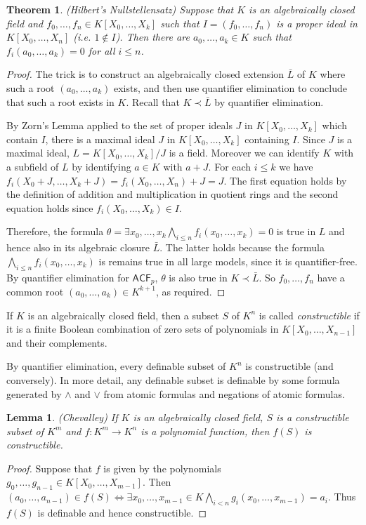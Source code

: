 \documentclass[a4paper, 11pt]{amsart}
\newtheorem{theorem}{Theorem}[subsection]
\newtheorem{lemma}[lemma]{Lemma}
\theoremstyle{remark}
\begin{document}
\begin{theorem} (Hilbert's Nullstellensatz) 
Suppose that $K$ is an algebraically closed field and $f_0,\dots,f_n\in K[X_0,\dots,X_k]$ such that $I=(f_0,\dots,f_n)$ is a proper ideal in $K[X_0,\dots,X_n]$ (i.e. $1\notin I$). Then there are $a_0,\dots,a_k\in K$ such that $f_i(a_0,\dots,a_k)=0$ for all $i\leq n$. 
\end{theorem} 
\begin{proof} 
The trick is to construct an algebraically closed extension $\bar{L}$ of $K$ where such a root $(a_0,\dots,a_k)$ exists, and then use quantifier elimination to conclude that such a root exists in $K$. 
Recall  that $K\prec \bar{L}$ by quantifier elimination. 

By Zorn's Lemma applied to the set of proper ideals $J$ in $K[X_0,\dots,X_k]$ which contain $I$, there is a maximal ideal $J$ in $K[X_0,\dots,X_k]$ containing $I$. Since $J$ is a maximal ideal, $L=K[X_0,\dots,X_k]/J$ is a field. Moreover we can identify $K$ with a subfield of $L$ by identifying $a\in K$ with $a+J$. 
For each $i\leq k$ we have $f_i(X_0+J,\dots,X_k+J)=f_i(X_0,\dots,X_n)+J=J$. 
The first equation holds by the definition of addition and multiplication in quotient rings and the second equation holds since $f_i(X_0,\dots,X_k)\in I$. 

Therefore, the formula $\theta=\exists x_0,\dots,x_k \bigwedge_{i\leq n} f_i(x_0,\dots,x_k)=0$ is true in $L$ and hence also in its algebraic closure $\bar{L}$. 
The latter holds because the formula $\bigwedge_{i\leq n} f_i(x_0,\dots,x_k)$ is remains true in all large models, since it is quantifier-free. 
By quantifier elimination for $\mathsf{ACF}_p$, $\theta$ is also true in $K\prec \bar{L}$. 
So $f_0,\dots,f_n$ have a common root $(a_0,\dots,a_k)\in K^{k+1}$, as required. 
\end{proof} 

If $K$ is an algebraically closed field, then a subset $S$ of $K^n$ is called \emph{constructible} if it is a finite Boolean combination of zero sets of polynomials in $K[X_0,\dots,X_{n-1}]$ and their complements. 

By quantifier elimination, every definable subset of $K^n$ is constructible (and conversely). 
In more detail, any definable subset is definable by some formula generated by $\wedge$ and $\vee$ from atomic formulas and negations of atomic formulas. 

\begin{lemma} (Chevalley) 
If $K$ is an algebraically closed field, $S$ is a constructible subset of $K^m$ and $f\colon K^m\rightarrow K^n$ is a polynomial function, then $f(S)$ is constructible. 
\end{lemma} 
\begin{proof} 
Suppose that $f$ is given by the polynomials $g_0,\dots,g_{n-1}\in K[X_0,\dots,X_{m-1}]$. Then $(a_0,\dots,a_{n-1})\in f(S)\Leftrightarrow \exists x_0,\dots,x_{m-1}\in K \bigwedge_{i<n} g_i(x_0,\dots,x_{m-1})=a_i$. Thus $f(S)$ is definable and hence constructible. 
\end{proof} 
\end{document}
